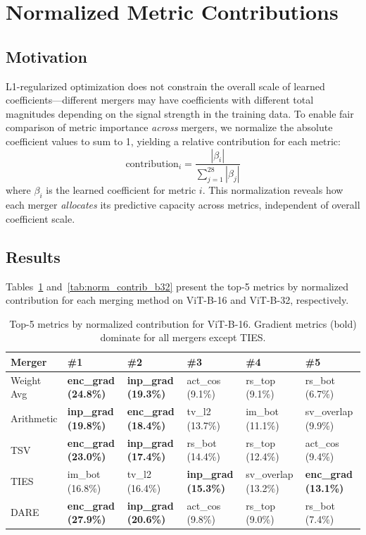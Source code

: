 \section{Normalized Metric Contributions}
\label{sec:normalized_contributions}

\subsection{Motivation}

L1-regularized optimization does not constrain the overall scale of learned coefficients---different mergers may have coefficients with different total magnitudes depending on the signal strength in the training data. To enable fair comparison of metric importance \emph{across} mergers, we normalize the absolute coefficient values to sum to 1, yielding a relative contribution for each metric:
\begin{equation}
\text{contribution}_i = \frac{|\beta_i|}{\sum_{j=1}^{28} |\beta_j|}
\end{equation}
where $\beta_i$ is the learned coefficient for metric $i$. This normalization reveals how each merger \emph{allocates} its predictive capacity across metrics, independent of overall coefficient scale.

\subsection{Results}

Tables~\ref{tab:norm_contrib_b16} and~\ref{tab:norm_contrib_b32} present the top-5 metrics by normalized contribution for each merging method on ViT-B-16 and ViT-B-32, respectively.

\begin{table}[h]
\centering
\caption{Top-5 metrics by normalized contribution for ViT-B-16. Gradient metrics (bold) dominate for all mergers except TIES.}
\label{tab:norm_contrib_b16}
\small
\begin{tabular}{llllll}
\toprule
\textbf{Merger} & \textbf{\#1} & \textbf{\#2} & \textbf{\#3} & \textbf{\#4} & \textbf{\#5} \\
\midrule
Weight Avg & \textbf{enc\_grad (24.8\%)} & \textbf{inp\_grad (19.3\%)} & act\_cos (9.1\%) & rs\_top (9.1\%) & rs\_bot (6.7\%) \\
Arithmetic & \textbf{inp\_grad (19.8\%)} & \textbf{enc\_grad (18.4\%)} & tv\_l2 (13.7\%) & im\_bot (11.1\%) & sv\_overlap (9.9\%) \\
TSV & \textbf{enc\_grad (23.0\%)} & \textbf{inp\_grad (17.4\%)} & rs\_bot (14.4\%) & rs\_top (12.4\%) & act\_cos (9.4\%) \\
TIES & im\_bot (16.8\%) & tv\_l2 (16.4\%) & \textbf{inp\_grad (15.3\%)} & sv\_overlap (13.2\%) & \textbf{enc\_grad (13.1\%)} \\
DARE & \textbf{enc\_grad (27.9\%)} & \textbf{inp\_grad (20.6\%)} & act\_cos (9.8\%) & rs\_top (9.0\%) & rs\_bot (7.4\%) \\
\bottomrule
\end{tabular}
\end{table}

